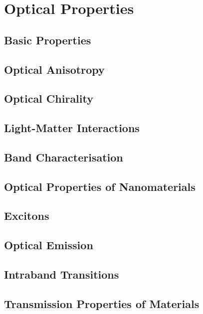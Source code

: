 \chapter{Optical Properties}
\label{chapt3}

\section{Basic Properties}

\section{Optical Anisotropy}

\section{Optical Chirality}

\section{Light-Matter Interactions}

\section{Band Characterisation}

\section{Optical Properties of Nanomaterials}

\section{Excitons}

\section{Optical Emission}

\section{Intraband Transitions}

\section{Transmission Properties of Materials}